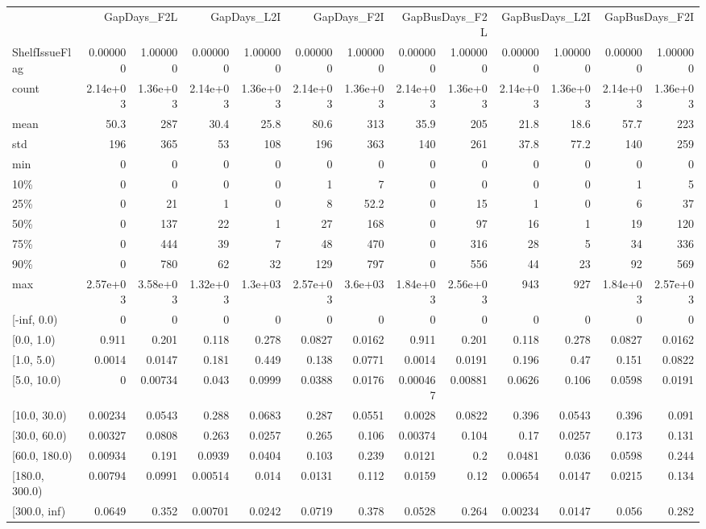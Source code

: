 \begin{tabular}{lrrrrrrrrrrrr}
\toprule
 & \multicolumn{2}{r}{GapDays\_F2L} & \multicolumn{2}{r}{GapDays\_L2I} & \multicolumn{2}{r}{GapDays\_F2I} & \multicolumn{2}{r}{GapBusDays\_F2L} & \multicolumn{2}{r}{GapBusDays\_L2I} & \multicolumn{2}{r}{GapBusDays\_F2I} \\
ShelfIssueFlag & 0.000000 & 1.000000 & 0.000000 & 1.000000 & 0.000000 & 1.000000 & 0.000000 & 1.000000 & 0.000000 & 1.000000 & 0.000000 & 1.000000 \\
\midrule
count & 2.14e+03 & 1.36e+03 & 2.14e+03 & 1.36e+03 & 2.14e+03 & 1.36e+03 & 2.14e+03 & 1.36e+03 & 2.14e+03 & 1.36e+03 & 2.14e+03 & 1.36e+03 \\
mean & 50.3 & 287 & 30.4 & 25.8 & 80.6 & 313 & 35.9 & 205 & 21.8 & 18.6 & 57.7 & 223 \\
std & 196 & 365 & 53 & 108 & 196 & 363 & 140 & 261 & 37.8 & 77.2 & 140 & 259 \\
min & 0 & 0 & 0 & 0 & 0 & 0 & 0 & 0 & 0 & 0 & 0 & 0 \\
10\% & 0 & 0 & 0 & 0 & 1 & 7 & 0 & 0 & 0 & 0 & 1 & 5 \\
25\% & 0 & 21 & 1 & 0 & 8 & 52.2 & 0 & 15 & 1 & 0 & 6 & 37 \\
50\% & 0 & 137 & 22 & 1 & 27 & 168 & 0 & 97 & 16 & 1 & 19 & 120 \\
75\% & 0 & 444 & 39 & 7 & 48 & 470 & 0 & 316 & 28 & 5 & 34 & 336 \\
90\% & 0 & 780 & 62 & 32 & 129 & 797 & 0 & 556 & 44 & 23 & 92 & 569 \\
max & 2.57e+03 & 3.58e+03 & 1.32e+03 & 1.3e+03 & 2.57e+03 & 3.6e+03 & 1.84e+03 & 2.56e+03 & 943 & 927 & 1.84e+03 & 2.57e+03 \\
[-inf, 0.0) & 0 & 0 & 0 & 0 & 0 & 0 & 0 & 0 & 0 & 0 & 0 & 0 \\
[0.0, 1.0) & 0.911 & 0.201 & 0.118 & 0.278 & 0.0827 & 0.0162 & 0.911 & 0.201 & 0.118 & 0.278 & 0.0827 & 0.0162 \\
[1.0, 5.0) & 0.0014 & 0.0147 & 0.181 & 0.449 & 0.138 & 0.0771 & 0.0014 & 0.0191 & 0.196 & 0.47 & 0.151 & 0.0822 \\
[5.0, 10.0) & 0 & 0.00734 & 0.043 & 0.0999 & 0.0388 & 0.0176 & 0.000467 & 0.00881 & 0.0626 & 0.106 & 0.0598 & 0.0191 \\
[10.0, 30.0) & 0.00234 & 0.0543 & 0.288 & 0.0683 & 0.287 & 0.0551 & 0.0028 & 0.0822 & 0.396 & 0.0543 & 0.396 & 0.091 \\
[30.0, 60.0) & 0.00327 & 0.0808 & 0.263 & 0.0257 & 0.265 & 0.106 & 0.00374 & 0.104 & 0.17 & 0.0257 & 0.173 & 0.131 \\
[60.0, 180.0) & 0.00934 & 0.191 & 0.0939 & 0.0404 & 0.103 & 0.239 & 0.0121 & 0.2 & 0.0481 & 0.036 & 0.0598 & 0.244 \\
[180.0, 300.0) & 0.00794 & 0.0991 & 0.00514 & 0.014 & 0.0131 & 0.112 & 0.0159 & 0.12 & 0.00654 & 0.0147 & 0.0215 & 0.134 \\
[300.0, inf) & 0.0649 & 0.352 & 0.00701 & 0.0242 & 0.0719 & 0.378 & 0.0528 & 0.264 & 0.00234 & 0.0147 & 0.056 & 0.282 \\
\bottomrule
\end{tabular}
